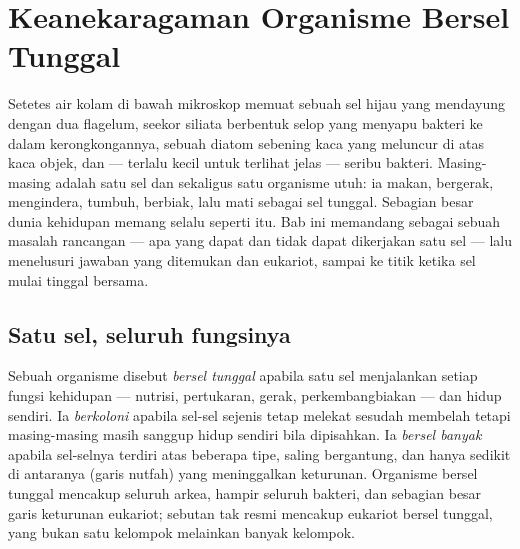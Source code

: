 \chapter{Keanekaragaman Organisme Bersel Tunggal}\label{ch:b2:unicellular-diversity}

Setetes air kolam di bawah mikroskop memuat sebuah sel hijau yang
mendayung dengan dua flagelum, seekor siliata berbentuk selop yang
menyapu bakteri ke dalam kerongkongannya, sebuah diatom sebening kaca
yang meluncur di atas kaca objek, dan --- terlalu kecil untuk terlihat
jelas --- seribu bakteri. Masing-masing adalah satu sel dan sekaligus
satu organisme utuh: ia makan, bergerak, mengindera, tumbuh, berbiak,
lalu mati sebagai sel tunggal. Sebagian besar dunia kehidupan memang
selalu seperti itu. Bab ini memandang  sebagai
sebuah masalah rancangan --- apa yang dapat dan tidak dapat dikerjakan
satu sel --- lalu menelusuri jawaban yang ditemukan  dan
eukariot, sampai ke titik ketika sel mulai tinggal bersama.

\section{Satu sel, seluruh fungsinya}

\begin{definition}\label{def:b2:unicellular-diversity:unicellular}
Sebuah organisme disebut \emph{bersel
tunggal} apabila satu sel menjalankan
setiap fungsi kehidupan ---
nutrisi, pertukaran, gerak, perkembangbiakan --- dan hidup sendiri. Ia
\emph{berkoloni} apabila sel-sel sejenis
tetap melekat sesudah membelah tetapi masing-masing masih sanggup hidup
sendiri bila dipisahkan. Ia \emph{bersel
banyak} apabila sel-selnya terdiri atas
beberapa tipe, saling bergantung, dan hanya sedikit di antaranya (garis
nutfah) yang meninggalkan keturunan. Organisme bersel tunggal mencakup
seluruh arkea, hampir seluruh bakteri, dan sebagian besar garis
keturunan eukariot; sebutan tak resmi \emph{} mencakup eukariot
bersel tunggal, yang bukan satu kelompok melainkan banyak kelompok.
\end{definition}

